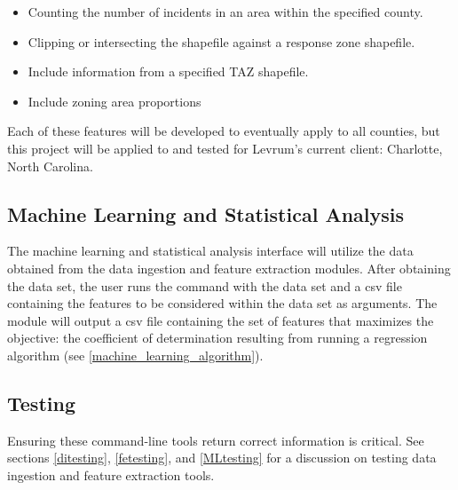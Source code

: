 \documentclass[onecolumn, draftclsnofoot,10pt, compsoc]{IEEEtran}
\begin{document}
\begin{singlespace}
    \begin{itemize}
        \item Counting the number of incidents in an area within the specified county.
        \item Clipping or intersecting the shapefile against a response zone shapefile.
        \item Include information from a specified TAZ shapefile.
        \item Include zoning area proportions
    \end{itemize}

    Each of these features will be developed to eventually apply to all counties, but this project will be applied to and tested for Levrum's current client: Charlotte, North Carolina. 
    
    \subsection{Machine Learning and Statistical Analysis}
    The machine learning and statistical analysis interface will utilize the data obtained from the data ingestion and feature extraction modules.
    After obtaining the data set, the user runs the command with the data set and a csv file containing the features to be considered within the data set as arguments.
    The module will output a csv file containing the set of features that maximizes the objective: the coefficient of determination resulting from running a regression algorithm (see \ref{machine_learning_algorithm}).
    
	\subsection{Testing}
	Ensuring these command-line tools return correct information is critical. See sections \ref{ditesting}, \ref{fetesting}, and \ref{MLtesting} for a discussion on testing data ingestion and feature extraction tools.


\end{singlespace}
\end{document}
